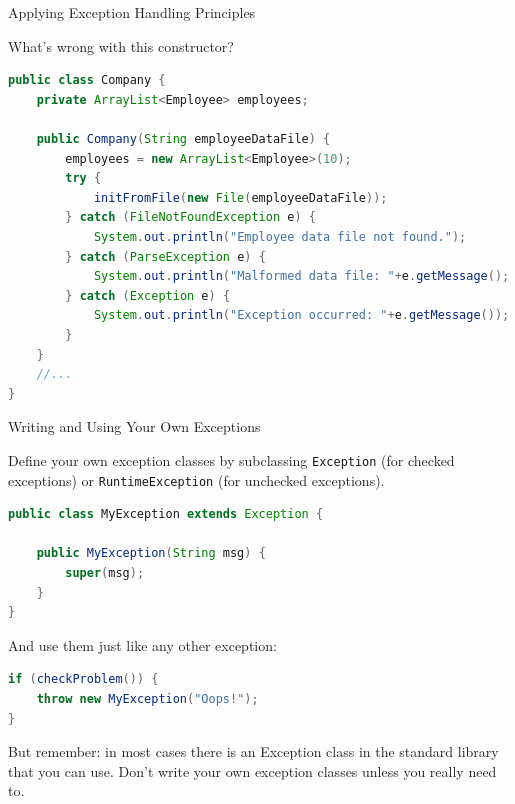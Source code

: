\documentclass{beamer}
\begin{document}
\begin{frame}[fragile]{Applying Exception Handling Principles}


What's wrong with this constructor?
\begin{lstlisting}[language=Java]
public class Company {
    private ArrayList<Employee> employees;

    public Company(String employeeDataFile) {
        employees = new ArrayList<Employee>(10);
        try {
            initFromFile(new File(employeeDataFile));
        } catch (FileNotFoundException e) {
            System.out.println("Employee data file not found.");
        } catch (ParseException e) {
            System.out.println("Malformed data file: "+e.getMessage();
        } catch (Exception e) {
            System.out.println("Exception occurred: "+e.getMessage());
        }
    }
    //...
}
\end{lstlisting}

\end{frame}

\begin{frame}[fragile]{Writing and Using Your Own Exceptions}


Define your own exception classes by subclassing {\tt Exception} (for checked exceptions) or {\tt RuntimeException} (for unchecked exceptions). 

\begin{lstlisting}[language=Java]
public class MyException extends Exception {

    public MyException(String msg) {
        super(msg);
    }
}
\end{lstlisting}
And use them just like any other exception:
\begin{lstlisting}[language=Java]
if (checkProblem()) {
    throw new MyException("Oops!");
}
\end{lstlisting}

But remember: in most cases there is an Exception class in the standard library that you can use. Don't write your own exception classes unless you really need to.

\end{frame}
\end{document}
